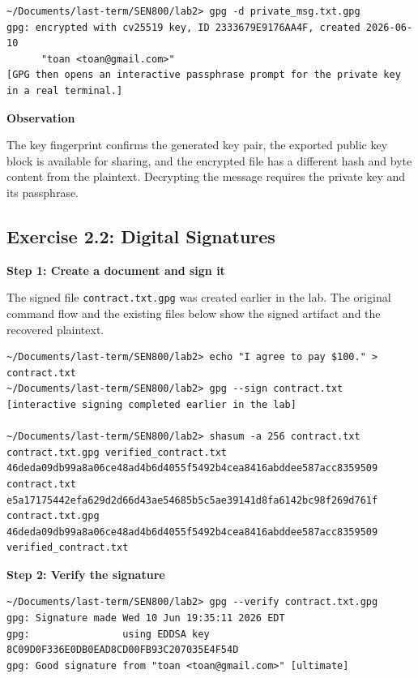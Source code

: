 \documentclass[12pt]{article}
\begin{document}
\begin{lstlisting}[style=terminal]
~/Documents/last-term/SEN800/lab2> gpg -d private_msg.txt.gpg
gpg: encrypted with cv25519 key, ID 2333679E9176AA4F, created 2026-06-10
      "toan <toan@gmail.com>"
[GPG then opens an interactive passphrase prompt for the private key in a real terminal.]
\end{lstlisting}

\textbf{Observation}

The key fingerprint confirms the generated key pair, the exported public key block is available for sharing, and the encrypted file has a different hash and byte content from the plaintext. Decrypting the message requires the private key and its passphrase.

\subsection*{Exercise 2.2: Digital Signatures}

\textbf{Step 1: Create a document and sign it}

The signed file \texttt{contract.txt.gpg} was created earlier in the lab. The original command flow and the existing files below show the signed artifact and the recovered plaintext.

\begin{lstlisting}[style=terminal]
~/Documents/last-term/SEN800/lab2> echo "I agree to pay $100." > contract.txt
~/Documents/last-term/SEN800/lab2> gpg --sign contract.txt
[interactive signing completed earlier in the lab]

~/Documents/last-term/SEN800/lab2> shasum -a 256 contract.txt contract.txt.gpg verified_contract.txt
46deda09db99a8a06ce48ad4b6d4055f5492b4cea8416abddee587acc8359509  contract.txt
e5a17175442efa629d2d66d43ae54685b5c5ae39141d8fa6142bc98f269d761f  contract.txt.gpg
46deda09db99a8a06ce48ad4b6d4055f5492b4cea8416abddee587acc8359509  verified_contract.txt
\end{lstlisting}

\textbf{Step 2: Verify the signature}

\begin{lstlisting}[style=terminal]
~/Documents/last-term/SEN800/lab2> gpg --verify contract.txt.gpg
gpg: Signature made Wed 10 Jun 19:35:11 2026 EDT
gpg:                using EDDSA key 8C09D0F336E0DB0EAD8CD00FB93C207035E4F54D
gpg: Good signature from "toan <toan@gmail.com>" [ultimate]
\end{lstlisting}
\end{document}
